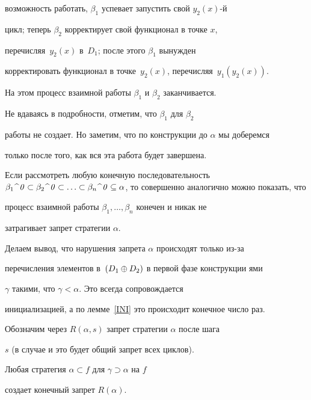 \begin{pf}
возможность работать, $\beta_1$ успевает запустить свой $y_2(x)$-й


цикл; теперь $\beta_2$ корректирует свой функционал в точке $x$,


перечисляя~$y_2(x)$ в~$D_1$; после этого $\beta_1$ вынужден


корректировать функционал в точке~$y_2(x)$, перечисляя~$y_1(y_2(x))$.


На этом процесс взаимной работы $\beta_1$ и $\beta_2$ заканчивается.


Не вдаваясь в подробности, отметим, что $\beta_1$ для $\beta_2$ 


работы не создает. Но заметим, что по конструкции до $\alpha$ мы доберемся 


только после того, как вся эта работа будет завершена.


 


Если рассмотреть любую конечную последовательность $\con{\beta_1}


{{\it 0}}\subset\con{\beta_2}{{\it 0}}\subset\dotsc\subset\con{\beta_n}


{{\it 0}}\subseteq\alpha$, то совершенно аналогично можно показать, что


процесс взаимной работы $\beta_1,\dotsc,\beta_n$ конечен и никак не


затрагивает запрет стратегии $\alpha$.





Делаем вывод, что нарушения запрета $\alpha$ происходят только из-за


перечисления элементов в~$(D_1\oplus D_2)$ в первой фазе конструкции ями


$\gamma$ такими, что $\gamma<\alpha$. Это всегда сопровождается


инициализацией, а по лемме~\ref{INI} это происходит конечное число раз.


\end{pf}





Обозначим через $R(\alpha,s)$ запрет стратегии $\alpha$ после шага


$s$ (в случае и это будет общий запрет всех циклов).





\begin{lth}\label{RES}


Любая стратегия $\alpha\subset f$ для $\gamma\supset\alpha$ на $f$


создает конечный запрет $R(\alpha)$.


\end{lth}





